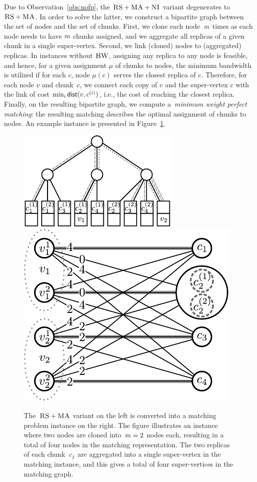  Due to Observation~\ref{obs:nofp}, the $\textsc{RS}+\textsc{MA}+\textsc{NI}$ variant degenerates to~$\textsc{RS}+\textsc{MA}$.
In order to solve the latter,
we construct a bipartite
graph between the set
of nodes and
the set of chunks.
First, we clone each node~$m$ times
as each node needs to have
$m$ chunks assigned, and we aggregate all replicas of a given chunk in a
single %
super-vertex.
Second, we link (cloned) nodes to (aggregated) replicas.
In instances without $\textsc{BW}$, assigning any replica to any node is feasible, and hence, for a given assignment $\mu$ of chunks to nodes, the minimum bandwidth is utilized if for each $c$, node $\mu(c)$ serves the closest replica of $c$.
Therefore, for each node $v$ and chunk~$c$, we connect each copy of $v$ and the super-vertex $c$ with the link of cost $\min_i \mathrm{\textsf{dist}}(v,c^{(i)})$, i.e., the cost of reaching the closest replica.
Finally, on the resulting bipartite graph, we compute a~\emph{minimum weight
perfect
matching}:
the resulting matching describes the optimal assignment of chunks to nodes.
An example instance is presented in Figure~\ref{fig:matching}.


\begin{figure}
  \centering
  \includegraphics[width = 0.39\columnwidth]{figs/static-mapping/model_ma_r_cv_boxes}
  \centering
  \hspace{1cm}
  \includegraphics[width =0.39\columnwidth]{figs/static-mapping/matching}
\caption{The~$\textsc{RS}+\textsc{MA}$ variant on the left is converted into a
  matching problem instance on the right.
The figure illustrates
an instance where two nodes are
cloned into~$m = 2$ nodes each,
resulting in a total of four nodes in
the matching representation.
The two replicas of each chunk~$c_j$ are
aggregated into a single super-vertex  in the matching instance, and
this gives a total of four super-vertices in the matching graph.
}
\label{fig:matching}
\end{figure}

